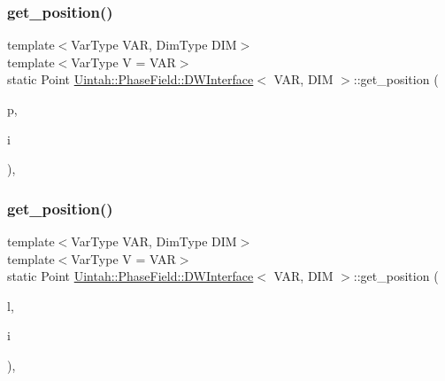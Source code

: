 \subsubsection{\texorpdfstring{get\+\_\+position()}{get\_position()}\hspace{0.1cm}{\footnotesize\ttfamily [1/2]}}
{\footnotesize\ttfamily template$<$Var\+Type V\+AR, Dim\+Type D\+IM$>$ \\
template$<$Var\+Type V = V\+AR$>$ \\
static Point \hyperlink{structUintah_1_1PhaseField_1_1DWInterface}{Uintah\+::\+Phase\+Field\+::\+D\+W\+Interface}$<$ V\+AR, D\+IM $>$\+::get\+\_\+position (\begin{DoxyParamCaption}\item[{const Patch $\ast$}]{p,  }\item[{const Int\+Vector \&}]{i }\end{DoxyParamCaption})\hspace{0.3cm}{\ttfamily [inline]}, {\ttfamily [static]}}

\mbox{\label{structUintah_1_1PhaseField_1_1DWInterface_a0e58176333dc74f9a936248a7a7194a2}} 
\subsubsection{\texorpdfstring{get\+\_\+position()}{get\_position()}\hspace{0.1cm}{\footnotesize\ttfamily [2/2]}}
{\footnotesize\ttfamily template$<$Var\+Type V\+AR, Dim\+Type D\+IM$>$ \\
template$<$Var\+Type V = V\+AR$>$ \\
static Point \hyperlink{structUintah_1_1PhaseField_1_1DWInterface}{Uintah\+::\+Phase\+Field\+::\+D\+W\+Interface}$<$ V\+AR, D\+IM $>$\+::get\+\_\+position (\begin{DoxyParamCaption}\item[{const Level $\ast$}]{l,  }\item[{const Int\+Vector \&}]{i }\end{DoxyParamCaption})\hspace{0.3cm}{\ttfamily [inline]}, {\ttfamily [static]}}

